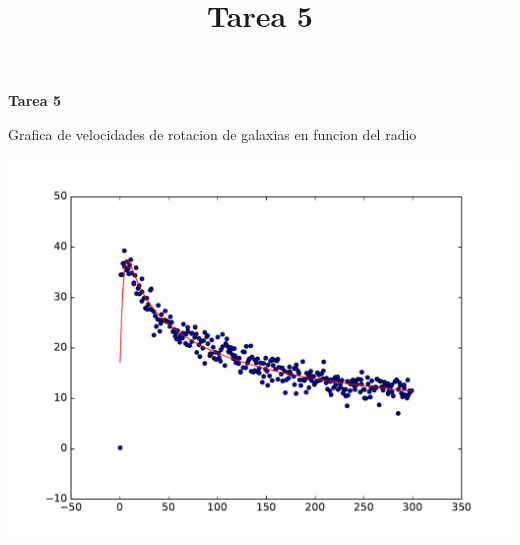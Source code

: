\documentclass{article}
\begin{document}
\title{Tarea 5}
\textbf{Tarea 5}

Grafica de velocidades de rotacion de galaxias en funcion del radio


\includegraphics[scale=0.5]{Grafica.pdf}
 
\end{document}
